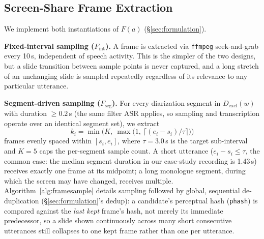 ﻿\documentclass[twocolumn]{article}
\begin{document}
\subsection{Screen-Share Frame Extraction}
\label{sec:method-frames}

We implement both instantiations of $F(a)$ (\S\ref{sec:formulation}).

\textbf{Fixed-interval sampling ($F_{\text{int}}$).} A frame is extracted via \texttt{ffmpeg}
seek-and-grab every 10\,s, independent of speech activity. This is the simpler of the two designs,
but a slide transition between sample points is never captured, and a long stretch of an unchanging
slide is sampled repeatedly regardless of its relevance to any particular utterance.

\textbf{Segment-driven sampling ($F_{\text{seg}}$).} For every diarization segment in
$D_{\text{excl}}(w)$ with duration $\geq 0.2$\,s (the same filter ASR applies, so sampling and
transcription operate over an identical segment set), we extract
\begin{equation}
  k_i = \min\!\Big(K,\ \max\big(1,\ \big\lceil (e_i - s_i) / \tau \big\rceil\big)\Big)
  \label{eq:k-samples}
\end{equation}
frames evenly spaced within $[s_i, e_i]$, where $\tau = 3.0$\,s is the target sub-interval and
$K=5$ caps the per-segment sample count. A short utterance ($e_i - s_i \leq \tau$, the common case:
the median segment duration in our case-study recording is 1.43\,s) receives exactly one frame at
its midpoint; a long monologue segment, during which the screen may have changed, receives
multiple. Algorithm~\ref{alg:framesample} details sampling followed by global, sequential
de-duplication (\S\ref{sec:formulation}'s $\mathrm{dedup}$): a candidate's perceptual hash
(\texttt{phash}) is compared against the \emph{last kept} frame's hash, not merely its immediate
predecessor, so a slide shown continuously across many short consecutive utterances still collapses
to one kept frame rather than one per utterance.
\end{document}
